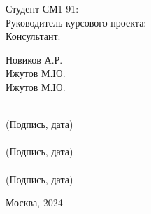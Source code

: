\vspace{2cm}
\begin{flushright}
    \begin{minipage}{0.4\linewidth}
        \begin{flushleft}
            Студент СМ1-91:
            \\
            \vspace{4ex}
            Руководитель курсового проекта:
            \\
            \vspace{4ex}
            Консультант:
        \end{flushleft}
    \end{minipage}
    \begin{minipage}{0.2\linewidth}
        \begin{flushleft}
            Новиков А.Р.
            \\
            \vspace{4ex}
            Ижутов М.Ю.
            \\
            \vspace{4ex}
            Ижутов М.Ю.
        \end{flushleft}
    \end{minipage}
    \begin{minipage}{0.3\linewidth}
        \begin{center}
            \vspace{5ex}
            \underline{\hspace{5cm}} 
            \\
            \footnotesize (Подпись, дата)
            \\[2ex]
            \underline{\hspace{5cm}} 
            \\
            \footnotesize (Подпись, дата)
            \\[2ex]
            \underline{\hspace{5cm}} 
            \\
            \footnotesize (Подпись, дата)
        \end{center}
    \end{minipage}
\end{flushright}
\begin{table}[b]
    \center Москва, 2024
\end{table}
\thispagestyle{empty}